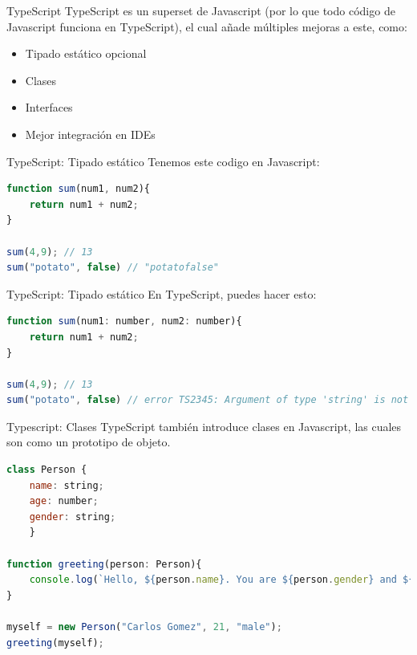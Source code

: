 \documentclass{beamer}
\begin{document}
\begin{frame}{TypeScript}
TypeScript es un superset de Javascript (por lo que todo código de Javascript funciona en TypeScript), el cual añade múltiples mejoras a este, como:
\begin{itemize}
    \item Tipado estático opcional
    \item Clases
    \item Interfaces
    \item Mejor integración en IDEs
\end{itemize}
\end{frame}

\begin{frame}[fragile]{TypeScript: Tipado estático}
Tenemos este codigo en Javascript:
\begin{lstlisting}[language=JavaScript]
function sum(num1, num2){
    return num1 + num2;
}

sum(4,9); // 13
sum("potato", false) // "potatofalse"
\end{lstlisting}
\end{frame}

\begin{frame}[fragile]{TypeScript: Tipado estático}
En TypeScript, puedes hacer esto:
\begin{lstlisting}[language=JavaScript]
function sum(num1: number, num2: number){
    return num1 + num2;
}

sum(4,9); // 13
sum("potato", false) // error TS2345: Argument of type 'string' is not assignable to parameter of type 'number'.
\end{lstlisting}
\end{frame}

\begin{frame}[fragile]{Typescript: Clases}
TypeScript también introduce clases en Javascript, las cuales son como un prototipo de objeto.

\begin{lstlisting}[language=JavaScript]
class Person {
    name: string;
    age: number;
    gender: string;
    }

function greeting(person: Person){
    console.log(`Hello, ${person.name}. You are ${person.gender} and ${person.age} years old.`);
}

myself = new Person("Carlos Gomez", 21, "male");
greeting(myself);
\end{lstlisting}
\end{frame}
\end{document}
